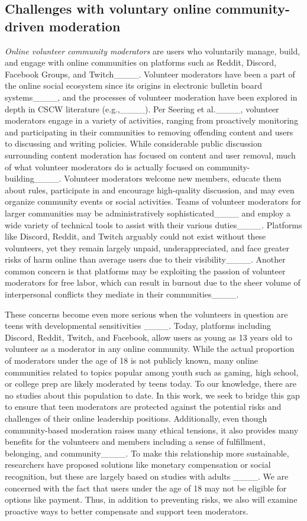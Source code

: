 \subsection{Challenges with voluntary online community-driven moderation}
\textit{Online volunteer community moderators} are users who voluntarily manage, build, and engage with online communities on platforms such as Reddit, Discord, Facebook Groups, and Twitch____. Volunteer moderators have been a part of the online social ecosystem since its origins in electronic bulletin board systems____, and the processes of volunteer moderation have been explored in depth in CSCW literature (e.g.,____). Per Seering et al.____, volunteer moderators engage in a variety of activities, ranging from proactively monitoring and participating in their communities to removing offending content and users to discussing and writing policies. While considerable public discussion surrounding content moderation has focused on content and user removal, much of what volunteer moderators do is actually focused on community-building____. Volunteer moderators welcome new members, educate them about rules, participate in and encourage high-quality discussion, and may even organize community events or social activities. Teams of volunteer moderators for larger communities may be administratively sophisticated____ and employ a wide variety of technical tools to assist with their various duties____. Platforms like Discord, Reddit, and Twitch arguably could not exist without these volunteers, yet they remain largely unpaid, underappreciated, and face greater risks of harm online than average users due to their visibility____. Another common concern is that platforms may be exploiting the passion of volunteer moderators for free labor, which can result in burnout due to the sheer volume of interpersonal conflicts they mediate in their communities____. 

These concerns become even more serious when the volunteers in question are teens with developmental sensitivities ____. Today, platforms including Discord, Reddit, Twitch, and Facebook, allow users as young as 13 years old to volunteer as a moderator in any online community. While the actual proportion of moderators under the age of 18 is not publicly known, many online communities related to topics popular among youth such as gaming, high school, or college prep are likely moderated by teens today. To our knowledge, there are no studies about this population to date. In this work, we seek to bridge this gap to ensure that teen moderators are protected against the potential risks and challenges of their online leadership positions. Additionally, even though community-based moderation raises many ethical tensions, it also provides many benefits for the volunteers and members including a sense of fulfillment, belonging, and community____. To make this relationship more sustainable, researchers have proposed solutions like monetary compensation or social recognition, but these are largely based on studies with adults ____. We are concerned with the fact that users under the age of 18 may not be eligible for options like payment. Thus, in addition to preventing risks, we also will examine proactive ways to better compensate and support teen moderators.

